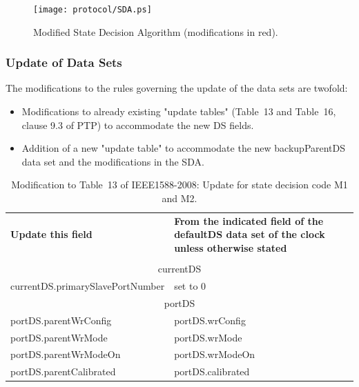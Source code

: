 \documentclass[a4paper, 12pt]{article}
\begin{document}
\begin{figure}[ht!]
  \centering
  \texttt{[image: protocol/SDA.ps]}
  \caption{Modified State Decision Algorithm (modifications in red).}
  \label{fig:modifiedSDA}
\end{figure}

\newpage

\subsubsection{Update of Data Sets}

The modifications to the rules governing the update of the data sets are twofold:
\begin{itemize}
  \item Modifications to already existing "update tables" (Table~13 and Table~16, clause 9.3 of
	PTP) to accommodate the new DS fields.
  \item Addition of a new "update table" to accommodate the new backupParentDS data set and 
	the modifications in the SDA.
\end{itemize}

\begin{table}[tbp]
\caption{Modification to Table~13 of IEEE1588-2008: Update for state decision code M1 and M2.}
\centering
\begin{tabular}{| p{7.5cm} | p{7.5cm}|}           \hline
\textbf{Update this field}  		&  
\textbf{From the indicated field of the defaultDS data set of the clock unless otherwise stated} \\ 
					&  						\\ \hline
\multicolumn{2}{|c|}{currentDS}								\\ \hline
currentDS.primarySlavePortNumber   	& set to 0					\\ \hline
\multicolumn{2}{|c|}{portDS}	   	 						\\ \hline
portDS.parentWrConfig   		& portDS.wrConfig				\\ \hline
portDS.parentWrMode   			& portDS.wrMode					\\ \hline
portDS.parentWrModeOn   		& portDS.wrModeOn				\\ \hline
portDS.parentCalibrated		   	& portDS.calibrated				\\ \hline

\end{tabular}
\label{tab:modifiedM1M2}
\end{table}
\end{document}
